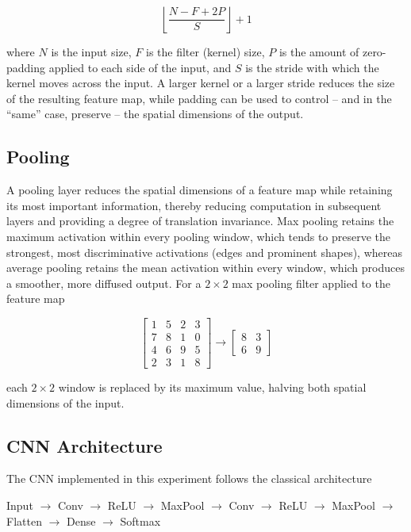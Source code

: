 \documentclass[11pt,a4paper]{article}
\begin{document}
\[
\left\lfloor\frac{N-F+2P}{S}\right\rfloor + 1
\]

where $N$ is the input size, $F$ is the filter (kernel) size, $P$ is the amount of zero-padding applied to each side of the input, and $S$ is the stride with which the kernel moves across the input. A larger kernel or a larger stride reduces the size of the resulting feature map, while padding can be used to control -- and in the ``same'' case, preserve -- the spatial dimensions of the output.

\subsection*{Pooling}

A pooling layer reduces the spatial dimensions of a feature map while retaining its most important information, thereby reducing computation in subsequent layers and providing a degree of translation invariance. Max pooling retains the maximum activation within every pooling window, which tends to preserve the strongest, most discriminative activations (edges and prominent shapes), whereas average pooling retains the mean activation within every window, which produces a smoother, more diffused output. For a $2\times2$ max pooling filter applied to the feature map

\[
\begin{bmatrix}
1 & 5 & 2 & 3\\
7 & 8 & 1 & 0\\
4 & 6 & 9 & 5\\
2 & 3 & 1 & 8
\end{bmatrix}
\rightarrow
\begin{bmatrix}
8 & 3\\
6 & 9
\end{bmatrix}
\]

each $2\times2$ window is replaced by its maximum value, halving both spatial dimensions of the input.

\subsection*{CNN Architecture}

The CNN implemented in this experiment follows the classical architecture

\begin{center}
Input $\rightarrow$ Conv $\rightarrow$ ReLU $\rightarrow$ MaxPool $\rightarrow$ Conv $\rightarrow$ ReLU $\rightarrow$ MaxPool $\rightarrow$ Flatten $\rightarrow$ Dense $\rightarrow$ Softmax
\end{center}
\end{document}
